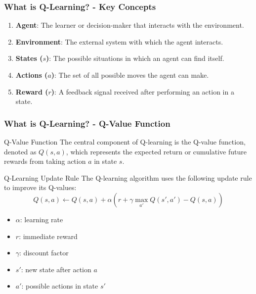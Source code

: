 \documentclass[aspectratio=169]{beamer}
\begin{document}
\begin{frame}[fragile]
    \frametitle{What is Q-Learning? - Key Concepts}
    \begin{enumerate}
        \item \textbf{Agent}: The learner or decision-maker that interacts with the environment.
        \item \textbf{Environment}: The external system with which the agent interacts.
        \item \textbf{States ($s$)}: The possible situations in which an agent can find itself.
        \item \textbf{Actions ($a$)}: The set of all possible moves the agent can make.
        \item \textbf{Reward ($r$)}: A feedback signal received after performing an action in a state.
    \end{enumerate}
\end{frame}

\begin{frame}[fragile]
    \frametitle{What is Q-Learning? - Q-Value Function}
    \begin{block}{Q-Value Function}
        The central component of Q-learning is the Q-value function, denoted as $Q(s, a)$, which represents the expected return or cumulative future rewards from taking action $a$ in state $s$.
    \end{block}
    \begin{block}{Q-Learning Update Rule}
        The Q-learning algorithm uses the following update rule to improve its Q-values:
        \begin{equation}
            Q(s, a) \leftarrow Q(s, a) + \alpha \left( r + \gamma \max_{a'} Q(s', a') - Q(s, a) \right)
        \end{equation}
    \end{block}
    \begin{itemize}
        \item $\alpha$: learning rate
        \item $r$: immediate reward
        \item $\gamma$: discount factor
        \item $s'$: new state after action $a$
        \item $a'$: possible actions in state $s'$
    \end{itemize}
\end{frame}
\end{document}
